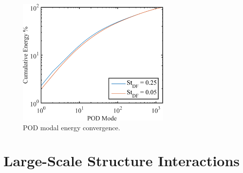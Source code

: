 \begin{figure}
	\centering
	\includegraphics[width=3in]{Figures/ch4_POD_energies.png}
	\caption{POD modal energy convergence.}
	\label{fig:ch4_modal_energy}
\end{figure}


\section{Large-Scale Structure Interactions}
